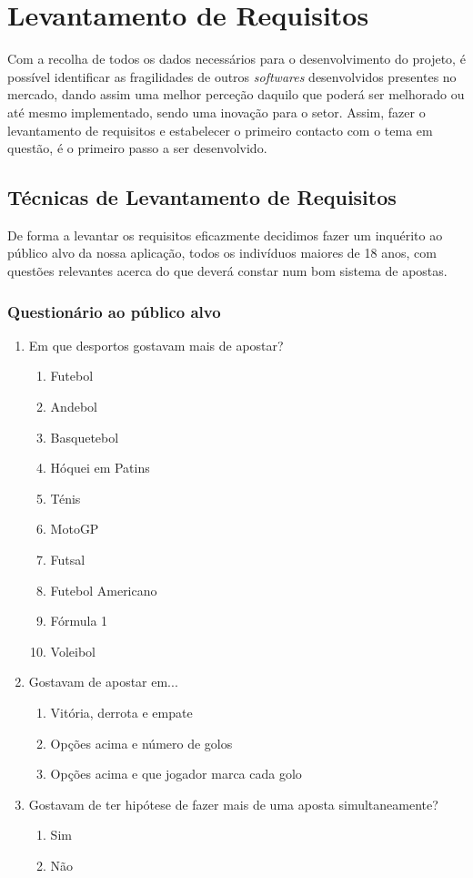 \chapter{Levantamento de Requisitos}

Com a recolha de todos os dados necessários para o desenvolvimento do projeto, é possível identificar as fragilidades de outros \textit{softwares} desenvolvidos presentes no mercado, dando assim uma melhor perceção daquilo que poderá ser melhorado ou até mesmo implementado, sendo uma inovação para o setor. Assim, fazer o levantamento de requisitos e estabelecer o primeiro contacto com o tema em questão, é o primeiro passo a ser desenvolvido.

\section{Técnicas de Levantamento de Requisitos}
De forma a levantar os requisitos eficazmente decidimos fazer um inquérito ao público alvo da nossa aplicação, todos os indivíduos maiores de 18 anos, com questões relevantes acerca do que deverá constar num bom sistema de apostas.
\subsection{Questionário ao público alvo}
\begin{enumerate}
    \item Em que desportos gostavam mais de apostar?
        \begin{enumerate}
            \item Futebol
            \item Andebol
            \item Basquetebol 
            \item Hóquei em Patins
            \item Ténis
            \item MotoGP
            \item Futsal
            \item Futebol Americano
            \item Fórmula 1
            \item Voleibol 
        \end{enumerate}
    \item Gostavam de apostar em...
        \begin{enumerate}
            \item Vitória, derrota e empate
            \item Opções acima e número de golos
            \item Opções acima e que jogador marca cada golo
        \end{enumerate}
    \item Gostavam de ter hipótese de fazer mais de uma aposta simultaneamente?
        \begin{enumerate}
            \item Sim
            \item Não
        \end{enumerate}
     
\end{enumerate}

